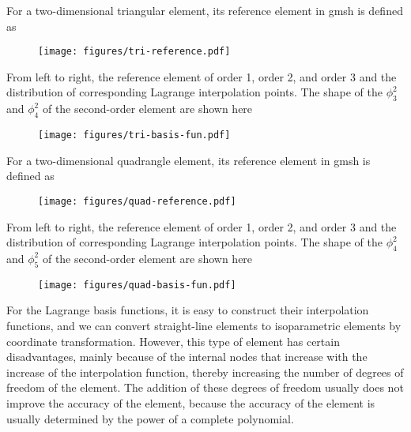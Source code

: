 \documentclass{develop-note}
\begin{document}
For a two-dimensional triangular element, its reference element in gmsh is defined as

\begin{figure}[H]
  \centering
  \texttt{[image: figures/tri-reference.pdf]}
\end{figure}

From left to right, the reference element of order 1, order 2, and order 3 and the distribution of corresponding Lagrange interpolation points. The shape of the $\phi_{3}^{2}$ and $\phi_{4}^{2}$ of the second-order element are shown here

\begin{figure}[H]
  \centering
  \texttt{[image: figures/tri-basis-fun.pdf]}
\end{figure}

For a two-dimensional quadrangle element, its reference element in gmsh is defined as

\begin{figure}[H]
  \centering
  \texttt{[image: figures/quad-reference.pdf]}
\end{figure}

From left to right, the reference element of order 1, order 2, and order 3 and the distribution of corresponding Lagrange interpolation points. The shape of the $\phi_{4}^{2}$ and $\phi_{5}^{2}$ of the second-order element are shown here

\begin{figure}[H]
  \centering
  \texttt{[image: figures/quad-basis-fun.pdf]}
\end{figure}

For the Lagrange basis functions, it is easy to construct their interpolation functions, and we can convert straight-line elements to isoparametric elements by coordinate transformation. However, this type of element has certain disadvantages, mainly because of the internal nodes that increase with the increase of the interpolation function, thereby increasing the number of degrees of freedom of the element. The addition of these degrees of freedom usually does not improve the accuracy of the element, because the accuracy of the element is usually determined by the power of a complete polynomial.
\end{document}
